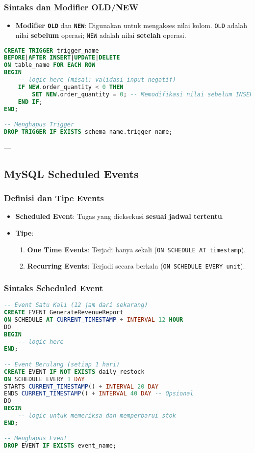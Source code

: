 \documentclass{article}
\begin{document}
\subsubsection{Sintaks dan Modifier OLD/NEW}
\begin{itemize}
    \item \textbf{Modifier \texttt{OLD}} dan \textbf{\texttt{NEW}}: Digunakan untuk mengakses nilai kolom. \texttt{OLD} adalah nilai \textbf{sebelum} operasi; \texttt{NEW} adalah nilai \textbf{setelah} operasi.
\end{itemize}
\begin{lstlisting}[language=SQL, caption={Sintaks Pembuatan Trigger}, captionpos=b]
CREATE TRIGGER trigger_name
BEFORE|AFTER INSERT|UPDATE|DELETE
ON table_name FOR EACH ROW
BEGIN
    -- logic here (misal: validasi input negatif)
    IF NEW.order_quantity < 0 THEN
        SET NEW.order_quantity = 0; -- Memodifikasi nilai sebelum INSERT
    END IF;
END;

-- Menghapus Trigger
DROP TRIGGER IF EXISTS schema_name.trigger_name;
\end{lstlisting}

---

\subsection{MySQL Scheduled Events}

\subsubsection{Definisi dan Tipe Events}
\begin{itemize}
    \item \textbf{Scheduled Event}: Tugas yang dieksekusi \textbf{sesuai jadwal tertentu}.
    \item \textbf{Tipe}:
          \begin{enumerate}
              \item \textbf{One Time Events}: Terjadi hanya sekali (\texttt{ON SCHEDULE AT timestamp}).
              \item \textbf{Recurring Events}: Terjadi secara berkala (\texttt{ON SCHEDULE EVERY unit}).
          \end{enumerate}
\end{itemize}

\subsubsection{Sintaks Scheduled Event}
\begin{lstlisting}[language=SQL, caption={Sintaks Pembuatan Scheduled Event}, captionpos=b]
-- Event Satu Kali (12 jam dari sekarang)
CREATE EVENT GenerateRevenueReport 
ON SCHEDULE AT CURRENT_TIMESTAMP + INTERVAL 12 HOUR
DO
BEGIN
    -- logic here
END;

-- Event Berulang (setiap 1 hari)
CREATE EVENT IF NOT EXISTS daily_restock  
ON SCHEDULE EVERY 1 DAY  
STARTS CURRENT_TIMESTAMP() + INTERVAL 20 DAY  
ENDS CURRENT_TIMESTAMP() + INTERVAL 40 DAY -- Opsional
DO  
BEGIN  
	-- logic untuk memeriksa dan memperbarui stok  
END;

-- Menghapus Event
DROP EVENT IF EXISTS event_name;
\end{lstlisting}
\end{document}
